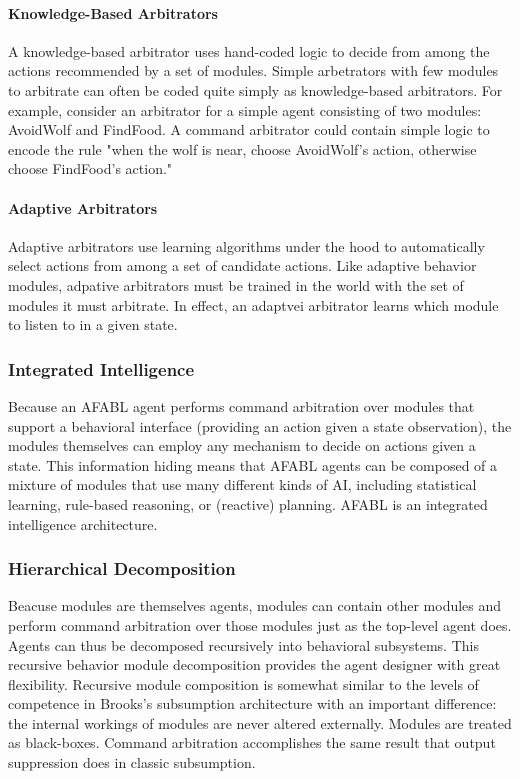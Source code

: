 \paragraph{Knowledge-Based Arbitrators}

A knowledge-based arbitrator uses hand-coded logic to decide from
among the actions recommended by a set of modules.  Simple arbetrators
with few modules to arbitrate can often be coded quite simply as
knowledge-based arbitrators.  For example, consider an arbitrator for
a simple agent consisting of two modules: AvoidWolf and FindFood.  A
command arbitrator could contain simple logic to encode the rule "when
the wolf is near, choose AvoidWolf's action, otherwise choose
FindFood's action."


\paragraph{Adaptive Arbitrators}

Adaptive arbitrators use learning algorithms under the hood to
automatically select actions from among a set of candidate actions.
Like adaptive behavior modules, adpative arbitrators must be trained
in the world with the set of modules it must arbitrate.  In effect, an
adaptvei arbitrator learns which module to listen to in a given state.


\subsubsection{Integrated Intelligence}

Because an AFABL agent performs command arbitration over modules that
support a behavioral interface (providing an action given a state
observation), the modules themselves can employ any mechanism to
decide on actions given a state.  This information hiding means that
AFABL agents can be composed of a mixture of modules that use many
different kinds of AI, including statistical learning, rule-based
reasoning, or (reactive) planning.  AFABL is an integrated
intelligence architecture.



\subsubsection{Hierarchical Decomposition}


Beacuse modules are themselves agents, modules can contain other
modules and perform command arbitration over those modules just as the
top-level agent does.  Agents can thus be decomposed recursively into
behavioral subsystems.  This recursive behavior module decomposition
provides the agent designer with great flexibility.  Recursive module
composition is somewhat similar to the levels of competence in
Brooks's subsumption architecture with an important difference: the
internal workings of modules are never altered externally.  Modules
are treated as black-boxes.  Command arbitration accomplishes the same
result that output suppression does in classic subsumption.

